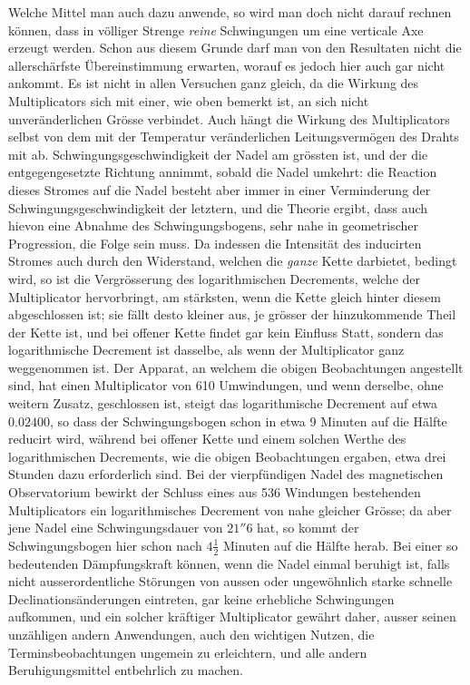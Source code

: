 \expandafter\def\csname HistoricalNoteText393\endcsname{Welche Mittel man auch dazu anwende, so wird man doch nicht darauf rechnen können, dass in völliger Strenge \textit{reine} Schwingungen um eine verticale Axe erzeugt werden. Schon aus diesem Grunde darf man von den Resultaten nicht die allerschärfste Übereinstimmung erwarten, worauf es jedoch hier auch gar nicht ankommt.}
\expandafter\def\csname HistoricalNoteText392\endcsname{Es ist nicht in allen Versuchen ganz gleich, da die Wirkung des Multiplicators sich mit einer, wie oben bemerkt ist, an sich nicht unveränderlichen Grösse verbindet. Auch hängt die Wirkung des Multiplicators selbst von dem mit der Temperatur veränderlichen Leitungsvermögen des Drahts mit ab.}
Schwingungsgeschwindigkeit der Nadel am grössten ist, und der die entgegengesetzte Richtung annimmt, sobald die Nadel umkehrt: die Reaction dieses Stromes auf die Nadel besteht aber immer in einer Verminderung der Schwingungsgeschwindigkeit der letztern, und die Theorie ergibt, dass auch hievon eine Abnahme des Schwingungsbogens, sehr nahe in geometrischer Progression, die Folge sein muss. Da indessen die Intensität des inducirten Stromes auch durch den Widerstand, welchen die \textit{ganze} Kette darbietet, bedingt wird, so ist die Vergrösserung des logarithmischen Decrements, welche der Multiplicator hervorbringt, am stärksten, wenn die Kette gleich hinter diesem abgeschlossen ist; sie fällt desto kleiner aus, je grösser der hinzukommende Theil der Kette ist, und bei offener Kette findet gar kein Einfluss Statt, sondern das logarithmische Decrement ist dasselbe, als wenn der Multiplicator ganz weggenommen ist. Der Apparat, an welchem die obigen Beobachtungen angestellt sind, hat einen Multiplicator von 610 Umwindungen, und wenn derselbe, ohne weitern Zusatz, geschlossen ist, steigt das logarithmische Decrement auf etwa $0.02400$, so dass der Schwingungsbogen schon in etwa 9 Minuten auf die Hälfte reducirt wird, während bei offener Kette und einem solchen Werthe des logarithmischen Decrements, wie die obigen Beobachtungen ergaben, etwa drei Stunden dazu erforderlich sind. Bei der vierpfündigen Nadel des magnetischen Observatorium bewirkt der Schluss eines aus 536 Windungen bestehenden Multiplicators ein logarithmisches Decrement von nahe gleicher Grösse; da aber jene Nadel eine Schwingungsdauer von $21''6$ hat, so kommt der Schwingungsbogen hier schon nach $4\tfrac12$ Minuten auf die Hälfte herab. Bei einer so bedeutenden Dämpfungskraft können, wenn die Nadel einmal beruhigt ist, falls nicht ausserordentliche Störungen von aussen oder ungewöhnlich starke schnelle Declinationsänderungen eintreten, gar keine erhebliche Schwingungen aufkommen, und ein solcher kräftiger Multiplicator gewährt daher, ausser seinen unzähligen andern Anwendungen, auch den wichtigen Nutzen, die Terminsbeobachtungen ungemein zu erleichtern, und alle andern Beruhigungsmittel entbehrlich zu machen.

